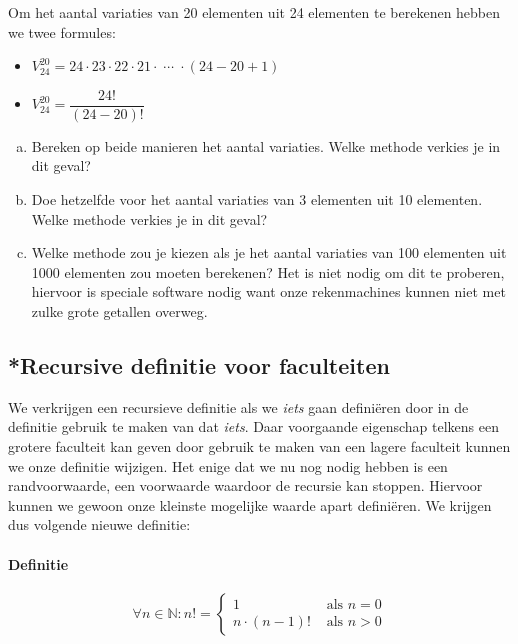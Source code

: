 \documentclass[12pt,a4,twoside]{article}
\begin{document}
\begin{oefening}
Om het aantal variaties van 20 elementen uit 24 elementen te berekenen hebben we twee formules:\\
\begin{itemize}
  \itemsep1em
  \item $\displaystyle V^{20}_{24}=24\cdot23\cdot22\cdot21\cdot\;\cdots\;\cdot(24-20+1)$
  \item $\displaystyle V^{20}_{24}=\dfrac{24!}{(24-20)!}$
\end{itemize}
\begin{enumerate}[(a)]
  \item Bereken op beide manieren het aantal variaties. Welke methode verkies je in dit geval?
  \item Doe hetzelfde voor het aantal variaties van 3 elementen uit 10 elementen. Welke methode verkies je in dit geval?
  \item Welke methode zou je kiezen als je het aantal variaties van 100 elementen uit 1000 elementen zou moeten berekenen? Het is niet nodig om dit te proberen, hiervoor is speciale software nodig want onze rekenmachines kunnen niet met zulke grote getallen overweg.
\end{enumerate}
\end{oefening}

\subsection{*Recursive definitie voor faculteiten}

We verkrijgen een recursieve definitie als we {\em iets} gaan definiëren door in de definitie gebruik te maken van dat {\em iets}. Daar voorgaande eigenschap telkens een grotere faculteit kan geven door gebruik te maken van een lagere faculteit kunnen we onze definitie wijzigen. Het enige dat we nu nog nodig hebben is een randvoorwaarde, een voorwaarde waardoor de recursie kan stoppen. Hiervoor kunnen we gewoon onze kleinste mogelijke waarde apart definiëren. We krijgen dus volgende nieuwe definitie:

\paragraph*{Definitie}
\begin{mdframed}
  \[\forall n \in \mathbb{N} : n!=
    \begin{cases}
      1        &\mbox{ als } n=0\\
      n \cdot (n-1)! &\mbox{ als } n>0
    \end{cases}
  \]
\end{mdframed}
\end{document}
